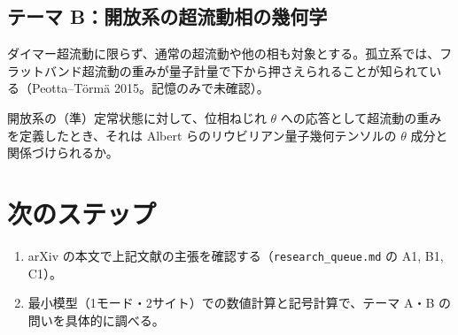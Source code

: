 \documentclass[11pt]{ltjsarticle}
\begin{document}
\subsection*{テーマ B：開放系の超流動相の幾何学}

ダイマー超流動に限らず、通常の超流動や他の相も対象とする。孤立系では、フラットバンド超流動の重みが量子計量で下から押さえられることが知られている（Peotta--Törmä 2015。記憶のみで未確認）。

\begin{question}
\unverified{} 開放系の（準）定常状態に対して、位相ねじれ $\theta$ への応答として超流動の重みを定義したとき、それは Albert らのリウビリアン量子幾何テンソルの $\theta$ 成分と関係づけられるか。
\end{question}

\section{次のステップ}
\begin{enumerate}
\item arXiv の本文で上記文献の主張を確認する（\texttt{research\_queue.md} の A1, B1, C1）。
\item 最小模型（1モード・2サイト）での数値計算と記号計算で、テーマ A・B の問いを具体的に調べる。
\end{enumerate}
\end{document}
